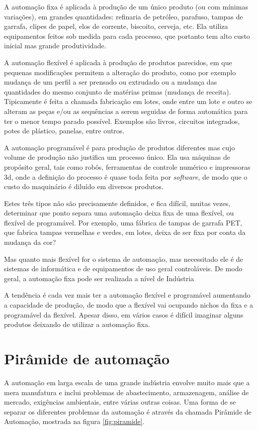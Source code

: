 A automação fixa é aplicada à produção de um único produto (ou com mínimas variações), em grandes quantidades: refinaria de petróleo, parafuso, tampas de garrafa, clipes de papel, elos de corrente, biscoito, cerveja, etc. Ela utiliza equipamentos feitos sob medida para cada processo, que portanto tem alto custo inicial mas grande produtividade.

A automação flexível é aplicada à produção de produtos parecidos, em que pequenas modificações permitem a alteração do produto, como por exemplo mudança de um perfil a ser prensado ou extrudado ou a mudança das quantidades do mesmo conjunto de matérias primas (mudança de receita). Tipicamente é feita a chamada fabricação em lotes, onde entre um lote e outro se alteram as peças e/ou as sequências a serem seguidas de forma automática para ter o menor tempo parado possível. Exemplos são livros, circuitos integrados, potes de plástico, panelas, entre outros.

A automação programável é para produção de produtos diferentes mas cujo volume de produção não justifica um processo único. Ela usa máquinas de propósito geral, tais como robôs, ferramentas de controle numérico e impressoras 3d, onde a definição do processo é quase toda feita por \emph{software}, de modo que o custo do maquinário é diluído em diversos produtos.

Estes três tipos não são precisamente definidos, e fica difícil, muitas vezes, determinar que ponto separa uma automação deixa fixa de uma flexível, ou flexível de programável. Por exemplo, uma fábrica de tampas de garrafa PET, que fabrica tampas vermelhas e verdes, em lotes, deixa de ser fixa por conta da mudança da cor?

Mas quanto mais flexível for o sistema de automação, mas necessitado ele é de sistemas de informática e de equipamentos de uso geral controláveis. De modo geral, a automação fixa pode ser realizada a nível de Indústria

A tendência é cada vez mais ter a automação flexível e programável aumentando a capacidade de produção, de modo que a flexível vai ocupando nichos da fixa e a programável da flexível. Apesar disso, em vários casos é difícil imaginar alguns produtos deixando de utilizar a automação fixa.

\section{Pirâmide de automação}

A automação em larga escala de uma grande indústria envolve muito mais que a mera manufatura e inclui problemas de abastecimento, armazenagem, análise de mercado, exigências ambientais, entre várias outras coisas. Uma forma de se separar os diferentes problemas da automação é através da chamada Pirâmide de Automação, mostrada na figura \ref{fig:piramide}.

